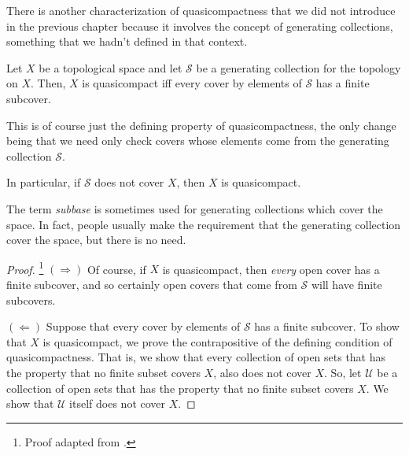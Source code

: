 There is another characterization of quasicompactness that we did not introduce in the previous chapter because it involves the concept of generating collections, something that we hadn't defined in that context.
\begin{thm}\label{AlexanderSubbaseTheorem}
Let $X$ be a topological space and let $\mathcal{S}$ be a generating collection for the topology on $X$.  Then, $X$ is quasicompact iff every cover by elements of $\mathcal{S}$ has a finite subcover.
\begin{rmk}
This is of course just the defining property of quasicompactness, the only change being that we need only check covers whose elements come from the generating collection $\mathcal{S}$.
\end{rmk}
\begin{rmk}
In particular, if $\mathcal{S}$ does not cover $X$, then $X$ is quasicompact.
\end{rmk}
\begin{rmk}
The term \emph{subbase} is sometimes used for generating collections which cover the space.  In fact, people usually make the requirement that the generating collection cover the space, but there is no need.
\end{rmk}
\begin{proof}\footnote{Proof adapted from \cite[pg.~139]{Kelley}.}
$(\Rightarrow )$ Of course, if $X$ is quasicompact, then \emph{every} open cover has a finite subcover, and so certainly open covers that come from $\mathcal{S}$ will have finite subcovers.

\blankline
\noindent
$(\Leftarrow )$ 
Suppose that every cover by elements of $\mathcal{S}$ has a finite subcover.  To show that $X$ is quasicompact, we prove the contrapositive of the defining condition of quasicompactness.  That is, we show that every collection of open sets that has the property that no finite subset covers $X$, also does not cover $X$.  So, let $\mathcal{U}$ be a collection of open sets that has the property that no finite subset covers $X$.  We show that $\mathcal{U}$ itself does not cover $X$.


\end{proof}
\end{thm}
